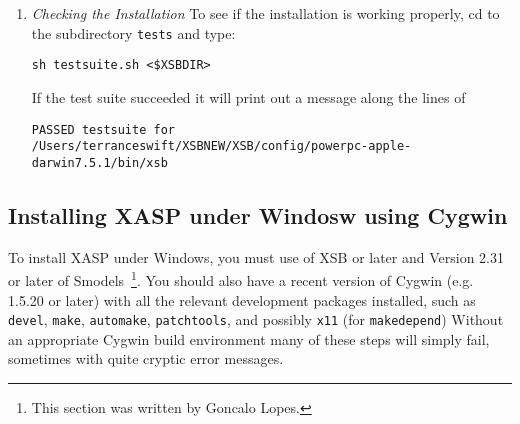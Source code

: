 \begin{enumerate}
  Once the {\tt smoMakefile} is obtained, it should be moved into the
  {\tt xasp} directory from \\ {\tt \$XSBDIR/config/<configuration+tag>}.
  Then type the following two commands:
%
\begin{verbatim}
  make -f smoMakefile module

  make -f smoMakefile all
\end{verbatim}
%
\item {\em Checking the Installation} 
%
To see if the installation is working properly, cd to the subdirectory
{\tt tests} and type: 

{\tt sh testsuite.sh <\$XSBDIR>}

If the test suite succeeded it will print out a message along the lines of 

\begin{small}
{\tt PASSED testsuite for /Users/terranceswift/XSBNEW/XSB/config/powerpc-apple-darwin7.5.1/bin/xsb}
\end{small}

\end{enumerate}

\subsection{Installing XASP under Windosw using Cygwin}

To install XASP under Windows, you must use \version{} of XSB or later
and Version 2.31 or later of Smodels~\footnote{This section was
  written by Goncalo Lopes.}.  You should also have a recent version
of Cygwin (e.g. 1.5.20 or later) with all the relevant development
packages installed, such as {\tt devel}, {\tt make}, {\tt automake},
{\tt patchtools}, and possibly {\tt x11} (for {\tt makedepend})
Without an appropriate Cygwin build environment many of these steps
will simply fail, sometimes with quite cryptic error messages.

